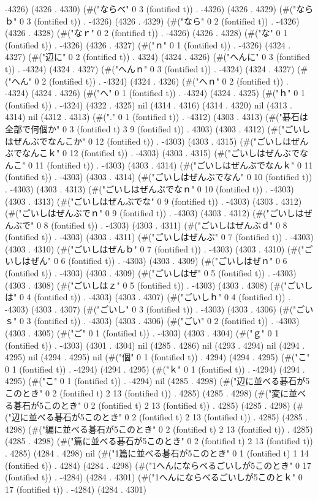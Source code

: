 -4326) (4326 . 4330) (#("ならべ" 0 3 (fontified t)) . -4326) (4326 . 4329) (#("ならｂ" 0 3 (fontified t)) . -4326) (4326 . 4329) (#("なら" 0 2 (fontified t)) . -4326) (4326 . 4328) (#("なｒ" 0 2 (fontified t)) . -4326) (4326 . 4328) (#("な" 0 1 (fontified t)) . -4326) (4326 . 4327) (#("ｎ" 0 1 (fontified t)) . -4326) (4324 . 4327) (#("辺に" 0 2 (fontified t)) . 4324) (4324 . 4326) (#("へんに" 0 3 (fontified t)) . -4324) (4324 . 4327) (#("へんｎ" 0 3 (fontified t)) . -4324) (4324 . 4327) (#("へん" 0 2 (fontified t)) . -4324) (4324 . 4326) (#("へｎ" 0 2 (fontified t)) . -4324) (4324 . 4326) (#("へ" 0 1 (fontified t)) . -4324) (4324 . 4325) (#("ｈ" 0 1 (fontified t)) . -4324) (4322 . 4325) nil (4314 . 4316) (4314 . 4320) nil (4313 . 4314) nil (4312 . 4313) (#("." 0 1 (fontified t)) . -4312) (4303 . 4313) (#("碁石は全部で何個か" 0 3 (fontified t) 3 9 (fontified t)) . 4303) (4303 . 4312) (#("ごいしはぜんぶでなんこか" 0 12 (fontified t)) . -4303) (4303 . 4315) (#("ごいしはぜんぶでなんこｋ" 0 12 (fontified t)) . -4303) (4303 . 4315) (#("ごいしはぜんぶでなんこ" 0 11 (fontified t)) . -4303) (4303 . 4314) (#("ごいしはぜんぶでなんｋ" 0 11 (fontified t)) . -4303) (4303 . 4314) (#("ごいしはぜんぶでなん" 0 10 (fontified t)) . -4303) (4303 . 4313) (#("ごいしはぜんぶでなｎ" 0 10 (fontified t)) . -4303) (4303 . 4313) (#("ごいしはぜんぶでな" 0 9 (fontified t)) . -4303) (4303 . 4312) (#("ごいしはぜんぶでｎ" 0 9 (fontified t)) . -4303) (4303 . 4312) (#("ごいしはぜんぶで" 0 8 (fontified t)) . -4303) (4303 . 4311) (#("ごいしはぜんぶｄ" 0 8 (fontified t)) . -4303) (4303 . 4311) (#("ごいしはぜんぶ" 0 7 (fontified t)) . -4303) (4303 . 4310) (#("ごいしはぜんｂ" 0 7 (fontified t)) . -4303) (4303 . 4310) (#("ごいしはぜん" 0 6 (fontified t)) . -4303) (4303 . 4309) (#("ごいしはぜｎ" 0 6 (fontified t)) . -4303) (4303 . 4309) (#("ごいしはぜ" 0 5 (fontified t)) . -4303) (4303 . 4308) (#("ごいしはｚ" 0 5 (fontified t)) . -4303) (4303 . 4308) (#("ごいしは" 0 4 (fontified t)) . -4303) (4303 . 4307) (#("ごいしｈ" 0 4 (fontified t)) . -4303) (4303 . 4307) (#("ごいし" 0 3 (fontified t)) . -4303) (4303 . 4306) (#("ごいｓ" 0 3 (fontified t)) . -4303) (4303 . 4306) (#("ごい" 0 2 (fontified t)) . -4303) (4303 . 4305) (#("ご" 0 1 (fontified t)) . -4303) (4303 . 4304) (#("ｇ" 0 1 (fontified t)) . -4303) (4301 . 4304) nil (4285 . 4286) nil (4293 . 4294) nil (4294 . 4295) nil (4294 . 4295) nil (#("個" 0 1 (fontified t)) . 4294) (4294 . 4295) (#("こ" 0 1 (fontified t)) . -4294) (4294 . 4295) (#("ｋ" 0 1 (fontified t)) . -4294) (4294 . 4295) (#("こ" 0 1 (fontified t)) . -4294) nil (4285 . 4298) (#("辺に並べる碁石が5このとき" 0 2 (fontified t) 2 13 (fontified t)) . 4285) (4285 . 4298) (#("変に並べる碁石が5このとき" 0 2 (fontified t) 2 13 (fontified t)) . 4285) (4285 . 4298) (#("辺に並べる碁石が5このとき" 0 2 (fontified t) 2 13 (fontified t)) . 4285) (4285 . 4298) (#("編に並べる碁石が5このとき" 0 2 (fontified t) 2 13 (fontified t)) . 4285) (4285 . 4298) (#("篇に並べる碁石が5このとき" 0 2 (fontified t) 2 13 (fontified t)) . 4285) (4284 . 4298) nil (#("1篇に並べる碁石が5このとき" 0 1 (fontified t) 1 14 (fontified t)) . 4284) (4284 . 4298) (#("1へんにならべるごいしが5このとき" 0 17 (fontified t)) . -4284) (4284 . 4301) (#("1へんにならべるごいしが5このとｋ" 0 17 (fontified t)) . -4284) (4284 . 4301) 